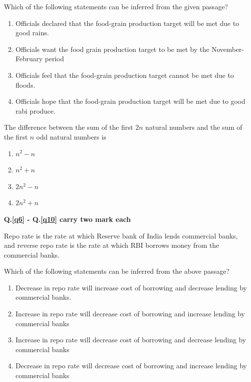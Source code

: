     Which of the following statements can be inferred from the given passage?
    \begin{enumerate}
        \item Officials declared that the food-grain production target will be met due to good rains.
        \item Officials want the food grain production target to be met by the November-February period
        \item Officials feel that the food-grain production target cannot be met due to floods.
        \item Officials hope that the food-grain production target will be met due to good rabi produce.
    \end{enumerate}

    \item \label{q5}The difference between the sum of the first $2n$ natural numbers and the sum of the first $n$ odd natural numbers is\underline{\hspace{2cm}}
    \begin{enumerate}
        \item $n^2 - n$
        \item $n^2 + n$
        \item $2n^2 - n$
        \item $2n^2 + n$
    \end{enumerate}

\textbf{Q.\ref{q6} - Q.\ref{q10} carry two mark each}

\item \label{q6}Repo rate is the rate at which Reserve bank of India lends commercial banks, and reverse repo rate is the rate at which RBI borrows money from the commercial banks.

Which of the following statements can be inferred from the above passage?
\begin{enumerate}
    \item Decrease in repo rate will increase cost of borrowing and decrease lending by commercial banks.
    \item Increase in repo rate will decrease cost of borrowing and increase lending by commercial banks
    \item Increase in repo rate will decrease cost of borrowing and decrease lending by commercial banks
    \item Decrease in repo rate will decrease cost of borrowing and increase lending by commercial banks
\end{enumerate}

